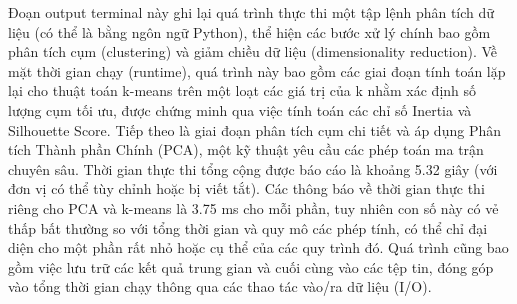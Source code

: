 \documentclass[12pt]{report}
\begin{document}
{Đoạn output terminal này ghi lại quá trình thực thi một tập lệnh phân tích dữ liệu (có thể là bằng ngôn ngữ Python), thể hiện các bước xử lý chính bao gồm phân tích cụm (clustering) và giảm chiều dữ liệu (dimensionality reduction). Về mặt thời gian chạy (runtime), quá trình này bao gồm các giai đoạn tính toán lặp lại cho thuật toán k-means trên một loạt các giá trị của k nhằm xác định số lượng cụm tối ưu, được chứng minh qua việc tính toán các chỉ số Inertia và Silhouette Score. Tiếp theo là giai đoạn phân tích cụm chi tiết và áp dụng Phân tích Thành phần Chính (PCA), một kỹ thuật yêu cầu các phép toán ma trận chuyên sâu. Thời gian thực thi tổng cộng được báo cáo là khoảng 5.32 giây (với đơn vị có thể tùy chỉnh hoặc bị viết tắt). Các thông báo về thời gian thực thi riêng cho PCA và k-means là 3.75 ms cho mỗi phần, tuy nhiên con số này có vẻ thấp bất thường so với tổng thời gian và quy mô các phép tính, có thể chỉ đại diện cho một phần rất nhỏ hoặc cụ thể của các quy trình đó. Quá trình cũng bao gồm việc lưu trữ các kết quả trung gian và cuối cùng vào các tệp tin, đóng góp vào tổng thời gian chạy thông qua các thao tác vào/ra dữ liệu (I/O).

}
\end{document}
